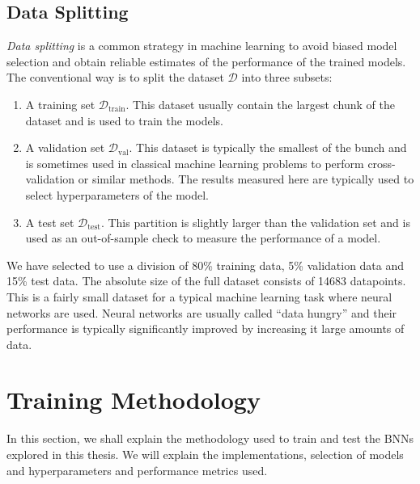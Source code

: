 \subsection{Data Splitting}
\textit{Data splitting} is a common strategy in machine learning to avoid biased model selection and obtain reliable estimates of the performance of the trained models.
The conventional way is to split the dataset $\mathcal{D}$ into three subsets: 
\begin{enumerate}
    \item A training set $\mathcal{D}_\text{train}$. This dataset usually contain the largest chunk of the dataset and is used to train the models.
    \item A validation set $\mathcal{D}_\text{val}$. This dataset is typically the smallest of the bunch and is sometimes used in classical machine learning problems to perform cross-validation or similar methods. The results measured here are typically used to select hyperparameters of the model.
    \item A test set $\mathcal{D}_\text{test}$. This partition is slightly larger than the validation set and is used as an out-of-sample check to measure the performance of a model. 
\end{enumerate}
We have selected to use a division of 80\% training data, 5\% validation data and 15\% test data. The absolute size of the full dataset consists of 14683 datapoints. This is a fairly small dataset for a typical machine learning task where neural networks are used. Neural networks are usually called ``data hungry'' and their performance is typically significantly improved by increasing it large amounts of data. 

\section{Training Methodology}
In this section, we shall explain the methodology used to train and test the BNNs explored in this thesis. We will explain the implementations, selection of models and hyperparameters and performance metrics used.

